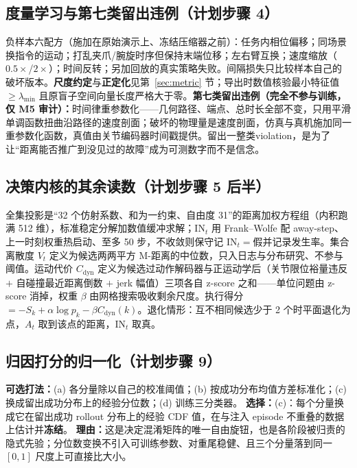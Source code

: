 \documentclass[11pt,a4paper]{ctexart}
\newcommand{\At}{A_t}
\newcommand{\Sk}{S_k}
\begin{document}
\subsection{度量学习与第七类留出违例（计划步骤 4）}\label{sec:metriclearn}

负样本六配方（施加在原始演示上、冻结压缩器之前）：任务内相位偏移；同场景换指令的运动；打乱夹爪/腕旋时序但保持末端位移；左右臂互换；速度缩放（$0.5\times$/$2\times$）；时间反转；另加回放的真实策略失败。间隔损失只比较样本自己的破坏版本。\textbf{尺度约定}与\textbf{正定化}见第~\ref{sec:metric} 节；导出时数值核验最小特征值 $\ge\lambda_{\min}$ 且原盲子空间向量长度严格大于零。\textbf{第七类留出违例（完全不参与训练，仅 M5 审计）：}时间律重参数化——几何路径、端点、总时长全部不变，只用平滑单调函数扭曲沿路径的速度剖面；破坏的物理量是速度剖面，仿真与真机施加同一重参数化函数，真值由关节编码器时间戳提供。留出一整类violation，是为了让``距离能否推广到没见过的故障''成为可测数字而不是信念。

\subsection{决策内核的其余读数（计划步骤 5 后半）}

全集投影是``32 个仿射系数、和为一约束、自由度 31''的距离加权方程组（内积跑满 512 维），标准稳定分解加数值缓冲求解；$\mathrm{IN}_t$ 用 Frank--Wolfe 配 away-step、上一时刻权重热启动、至多 50 步，不收敛则保守记 $\mathrm{IN}_t{=}$假并记录发生率。集合离散度 $V_t$ 定义为候选两两平方 M-距离的中位数，只入日志与分布研究、不参与阈值。运动代价 $C_{\mathrm{dyn}}$ 定义为候选过动作解码器与正运动学后（关节限位裕量违反 $+$ 自碰撞最近距离倒数 $+$ jerk 幅值）三项各自 z-score 之和——单位问题由 z-score 消掉，权重 $\beta$ 由网格搜索吸收剩余尺度。执行得分 $=-\Sk+\alpha\log p_k-\beta C_{\mathrm{dyn}}(k)$。退化情形：互不相同候选少于 2 个时平面退化为点，$\At$ 取到该点的距离，$\mathrm{IN}_t$ 取真。

\subsection{归因打分的归一化（计划步骤 9）}

\textbf{可选打法：}(a) 各分量除以自己的校准阈值；(b) 按成功分布均值方差标准化；(c) 换成留出成功分布上的经验分位数；(d) 训练三分类器。\quad
\textbf{选择：}(c)：每个分量换成它在留出成功 rollout 分布上的经验 CDF 值，在与注入 episode 不重叠的数据上估计并\textbf{冻结}。\quad
\textbf{理由：}这是决定混淆矩阵的唯一自由旋钮，也是各阶段被归责的隐式先验；分位数变换不引入可训练参数、对重尾稳健、且三个分量落到同一 $[0,1]$ 尺度上可直接比大小。
\end{document}
